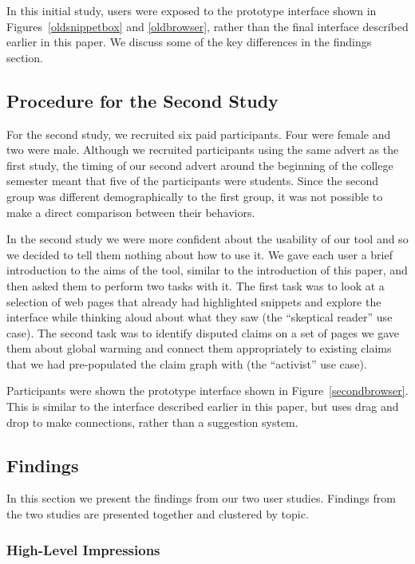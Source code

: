 \documentclass{chi2009}
\begin{document}
In this initial study, users were exposed to the prototype interface shown in Figures~\ref{oldsnippetbox} and \ref{oldbrowser}, rather than the final interface described earlier in this paper. We discuss some of the key differences in the findings section.

\subsection{Procedure for the Second Study}

For the second study, we recruited six paid participants.  %
Four were female and two were male. Although we recruited participants using the same advert as the first study, the timing of our second advert around the beginning of the college semester meant that five of the participants were students. Since the second group was different demographically to the first group, it was not possible to make a direct comparison between their behaviors. 

In the second study we were more confident about the usability of our tool and so we decided to tell them nothing about how to use it. We gave each user a brief introduction to the aims of the tool, similar to the introduction of this paper, and then asked them to perform two tasks with it. The first task was to look at a selection of web pages that already had highlighted snippets and explore the interface while thinking aloud about what they saw (the ``skeptical reader'' use case). The second task was to identify disputed claims on a set of pages we gave them about global warming and connect them appropriately to existing claims that we had pre-populated the claim graph with (the ``activist'' use case). 

Participants were shown the prototype interface shown in Figure~\ref{secondbrowser}. This is similar to the interface described earlier in this paper, but uses drag and drop to make connections, rather than a suggestion system.

\subsection{Findings}

In this section we present the findings from our two user studies. Findings from the two studies are presented together and clustered by topic.

\subsubsection{High-Level Impressions}  %
\end{document}
